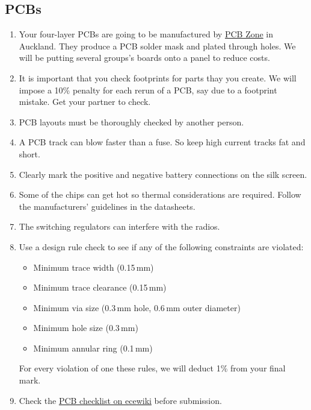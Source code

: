 \documentclass[11pt, a4paper]{article}
\begin{document}
\subsection{PCBs}

\begin{enumerate}
\item Your four-layer PCBs are going to be manufactured by
\href{http://ecewiki.elec.canterbury.ac.nz/mediawiki/index.php/PCB_Zone}{PCB
  Zone} in Auckland.  They produce a PCB solder mask and plated
through holes.  We will be putting several groups's boards onto a
panel to reduce costs.

\item It is important that you check footprints for parts thay you
  create.  We will impose a 10\% penalty for each rerun of a PCB, say
  due to a footprint mistake.  Get your partner to check.
  
\item PCB layouts must be thoroughly checked by another person.
  
\item A PCB track can blow faster than a fuse. So keep high current
  tracks fat and short.

\item Clearly mark the positive and negative battery connections on
  the silk screen.

\item Some of the chips can get hot so thermal considerations are
  required.  Follow the manufacturers' guidelines in the datasheets.

\item The switching regulators can interfere with the radios.
  
\item Use a design rule check to see if any of the following
  constraints are violated:
%
\begin{itemize}
\item Minimum trace width (0.15\,mm)
\item Minimum trace clearance (0.15\,mm)
\item Minimum via size (0.3\,mm hole, 0.6\,mm outer diameter)
\item Minimum hole size (0.3\,mm)
\item Minimum annular ring (0.1\,mm)
\end{itemize}
%
For every violation of one these rules, we will deduct 1\% from your
final mark.

\item Check the
  \href{http://ecewiki.elec.canterbury.ac.nz/mediawiki/index.php/PCB_checklist}{PCB
    checklist on ecewiki} before submission.
\end{enumerate}
\end{document}
